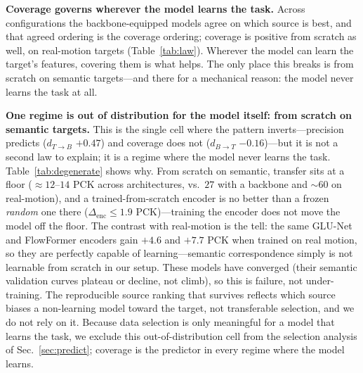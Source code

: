 \documentclass[runningheads]{llncs}
\newcommand{\dtb}{d_{T\to B}}
\newcommand{\dbt}{d_{B\to T}}
\newcommand{\pck}{PCK}
\begin{document}
\noindent\textbf{Coverage governs wherever the model learns the task.} Across
configurations the backbone-equipped models agree on which source is best, and
that agreed ordering is the coverage ordering; coverage is positive from scratch
as well, on real-motion targets (Table~\ref{tab:law}). Wherever the model can
learn the target's features, covering them is what helps. The only place this
breaks is from scratch on semantic targets---and there for a mechanical reason:
the model never learns the task at all.

\begin{table}[t]
\centering
\caption{\textbf{From-scratch models do not learn semantic correspondence.}
Mean peak \pck{} over the 11 training sources, for a trained-from-scratch encoder
(FF) vs.\ a \emph{frozen randomly-initialized} encoder (FT). On semantic targets
(bold) transfer sits at a floor (${\approx}12$--$14$ \pck) and training the
encoder buys almost nothing over leaving it random ($\Delta_{\text{enc}}\le 1.9$):
the model cannot learn the task. The same GLU-Net and FlowFormer encoders gain
$+4.6$ and $+7.7$ \pck{} on real-motion---they \emph{can} learn features, just
not semantic ones from scratch---so this is an out-of-distribution \emph{model}
regime, not a capacity limit. We exclude from-scratch$\times$semantic from the
selection analysis (Sec.~\ref{sec:predict}) on this basis. (CATs++'s encoder
adds little on real-motion either---its strong matching head does the work, and
it still reaches $58$ \pck{} there---so it supplies the floor but not the
real-vs-semantic contrast.)}
\label{tab:degenerate}
\small
\setlength{\tabcolsep}{6pt}

\end{table}

\noindent\textbf{One regime is out of distribution for the model itself: from
scratch on semantic targets.} This is the single cell where the pattern
inverts---precision predicts ($\dtb$ $+0.47$) and coverage does not ($\dbt$
$-0.16$)---but it is not a second law to explain; it is a regime where the model
never learns the task. Table~\ref{tab:degenerate} shows why. From scratch on
semantic, transfer sits at a floor (${\approx}12$--$14$ \pck{} across
architectures, vs.\ $27$ with a backbone and ${\sim}60$ on real-motion), and a
trained-from-scratch encoder is no better than a frozen \emph{random} one there
($\Delta_{\text{enc}}\le 1.9$ \pck)---training the encoder does not move the model
off the floor. The contrast with real-motion is the tell: the same GLU-Net and
FlowFormer encoders gain $+4.6$ and $+7.7$ \pck{} when trained on real motion, so
they are perfectly capable of learning---semantic correspondence simply is not
learnable from scratch in our setup. These models have converged (their semantic
validation curves plateau or decline, not climb), so this is failure, not
under-training. The reproducible source ranking that survives reflects which
source biases a non-learning model toward the target, not transferable
selection, and we do not rely on it. Because data selection is only meaningful
for a model that learns the task, we exclude this out-of-distribution cell from
the selection analysis of Sec.~\ref{sec:predict}; coverage is the predictor in
every regime where the model learns.
\end{document}
